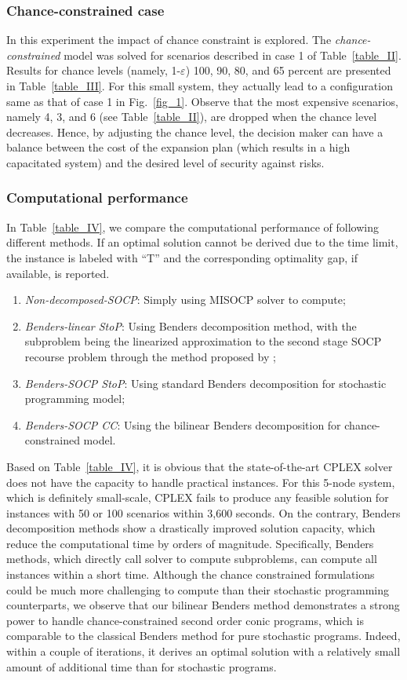 \documentclass[journal]{IEEEtran}
\theoremstyle{remark}
\begin{document}
\subsubsection{Chance-constrained case}
In this experiment the impact of chance constraint is explored. The \textit{chance-constrained} model was solved for scenarios described in case 1 of Table~\ref{table_II}. Results for chance  levels (namely, 1-$\varepsilon$) 100, 90, 80, and 65 percent are presented in Table~\ref{table_III}. For this small system, they actually lead to a configuration same as that of case 1 in Fig.~\ref{fig_1}. Observe that the most expensive scenarios, namely 4, 3, and 6 (see Table~\ref{table_II}), are dropped when the chance level decreases. Hence, by adjusting the chance level,  the decision maker can have a
balance between the cost of the expansion plan (which results in a high capacitated system) and the desired level of security against risks.

\subsubsection{Computational performance}
In Table~\ref{table_IV}, we compare the computational performance of following different methods. If an optimal solution cannot be derived due to the time limit, the instance is labeled with ``T'' and the corresponding optimality gap, if available, is reported.
 \begin{enumerate}
  \item \textit{Non-decomposed-SOCP}: Simply using MISOCP solver to  compute;
  \item \textit{Benders-linear StoP}: Using Benders decomposition method, with the subproblem being the linearized approximation to the second stage SOCP recourse problem through the method proposed by \citep{Ben-Tal};
  \item \textit{Benders-SOCP StoP}: Using standard Benders decomposition for stochastic programming model;
  \item \textit{Benders-SOCP CC}: Using the bilinear Benders decomposition for chance-constrained model.
\end{enumerate}
Based on Table~\ref{table_IV}, it is obvious that the state-of-the-art CPLEX solver
does not have the capacity to handle practical instances. For this 5-node system, which is definitely small-scale, CPLEX fails to produce any feasible solution for instances with 50 or 100 scenarios within 3,600 seconds. On the contrary, Benders decomposition methods show a drastically improved solution capacity, which reduce the computational time by orders of magnitude. Specifically, Benders methods, which directly call solver to compute subproblems, can compute all instances within a short time. Although the chance constrained formulations could be much more challenging to compute than their stochastic programming counterparts, we observe that our bilinear Benders method demonstrates a strong power to handle chance-constrained second order conic programs,
which is comparable to the classical Benders method for pure stochastic programs. Indeed, within a couple of iterations, it derives an optimal solution with a relatively small amount of additional time than for stochastic programs.
\end{document}
